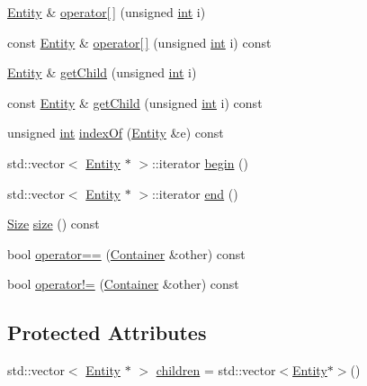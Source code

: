 \begin{DoxyCompactItemize}
\hyperlink{classmc_1_1_entity}{Entity} \& \hyperlink{classmc_1_1_container_a4d9c9836fca7685c9e3fd314cb2ef3e4}{operator\mbox{[}$\,$\mbox{]}} (unsigned \hyperlink{_s_d_l__thread_8h_a6a64f9be4433e4de6e2f2f548cf3c08e}{int} i)
\item 
const \hyperlink{classmc_1_1_entity}{Entity} \& \hyperlink{classmc_1_1_container_a9a7c43110b0b08ac5edbbfd0a668abe0}{operator\mbox{[}$\,$\mbox{]}} (unsigned \hyperlink{_s_d_l__thread_8h_a6a64f9be4433e4de6e2f2f548cf3c08e}{int} i) const 
\item 
\hyperlink{classmc_1_1_entity}{Entity} \& \hyperlink{classmc_1_1_container_a0f7ec1b14def81f1fbc4e534b7cff8be}{get\+Child} (unsigned \hyperlink{_s_d_l__thread_8h_a6a64f9be4433e4de6e2f2f548cf3c08e}{int} i)
\item 
const \hyperlink{classmc_1_1_entity}{Entity} \& \hyperlink{classmc_1_1_container_af5953e37ee8a9c24a4541e81502e9639}{get\+Child} (unsigned \hyperlink{_s_d_l__thread_8h_a6a64f9be4433e4de6e2f2f548cf3c08e}{int} i) const 
\item 
unsigned \hyperlink{_s_d_l__thread_8h_a6a64f9be4433e4de6e2f2f548cf3c08e}{int} \hyperlink{classmc_1_1_container_ac3b24eb59ccbca4290d032c07eb3e5f6}{index\+Of} (\hyperlink{classmc_1_1_entity}{Entity} \&e) const 
\item 
std\+::vector$<$ \hyperlink{classmc_1_1_entity}{Entity} $\ast$ $>$\+::iterator \hyperlink{classmc_1_1_container_a2838fe4f6068eba635df99b8180a63a1}{begin} ()
\item 
std\+::vector$<$ \hyperlink{classmc_1_1_entity}{Entity} $\ast$ $>$\+::iterator \hyperlink{classmc_1_1_container_af8ce53fdca38afc0c38fd8dc5c7de93d}{end} ()
\item 
\hyperlink{namespacemc_ad1c06461067735b3b17e0df612532c4e}{Size} \hyperlink{classmc_1_1_container_afcba0b879415347bffedde8b43fbce8a}{size} () const 
\item 
bool \hyperlink{classmc_1_1_container_a0c35995b63b9e4a0dc05208a744b326b}{operator==} (\hyperlink{classmc_1_1_container}{Container} \&other) const 
\item 
bool \hyperlink{classmc_1_1_container_af1787e3b31159afec58ee4fffbcec013}{operator!=} (\hyperlink{classmc_1_1_container}{Container} \&other) const 
\end{DoxyCompactItemize}
\subsection*{Protected Attributes}
\begin{DoxyCompactItemize}
\item 
std\+::vector$<$ \hyperlink{classmc_1_1_entity}{Entity} $\ast$ $>$ \hyperlink{classmc_1_1_container_a61ab3823bf33ae5f8f1bfdb79501b242}{children} = std\+::vector$<$\hyperlink{classmc_1_1_entity}{Entity}$\ast$$>$()
\end{DoxyCompactItemize}
